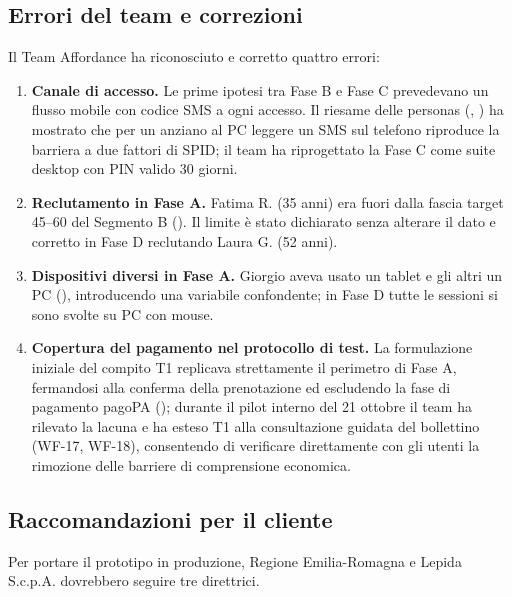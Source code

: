 \subsection{Errori del team e correzioni}

Il Team Affordance ha riconosciuto e corretto quattro errori:
\begin{enumerate}
\item \textbf{Canale di accesso.} Le prime ipotesi tra Fase B e Fase C prevedevano un flusso mobile con codice SMS a ogni accesso. Il riesame delle personas (, ) ha mostrato che per un anziano al PC leggere un SMS sul telefono riproduce la barriera a due fattori di SPID; il team ha riprogettato la Fase C come suite desktop con PIN valido 30 giorni.
\item \textbf{Reclutamento in Fase A.} Fatima R. (35 anni) era fuori dalla fascia target 45--60 del Segmento B (). Il limite è stato dichiarato senza alterare il dato e corretto in Fase D reclutando Laura G. (52 anni).
\item \textbf{Dispositivi diversi in Fase A.} Giorgio aveva usato un tablet e gli altri un PC (), introducendo una variabile confondente; in Fase D tutte le sessioni si sono svolte su PC con mouse.
\item \textbf{Copertura del pagamento nel protocollo di test.} La formulazione iniziale del compito T1 replicava strettamente il perimetro di Fase A, fermandosi alla conferma della prenotazione ed escludendo la fase di pagamento pagoPA (); durante il pilot interno del 21 ottobre il team ha rilevato la lacuna e ha esteso T1 alla consultazione guidata del bollettino (WF-17, WF-18), consentendo di verificare direttamente con gli utenti la rimozione delle barriere di comprensione economica.
\end{enumerate}

\subsection{Raccomandazioni per il cliente}

Per portare il prototipo in produzione, Regione Emilia-Romagna e Lepida S.c.p.A. dovrebbero seguire tre direttrici.

